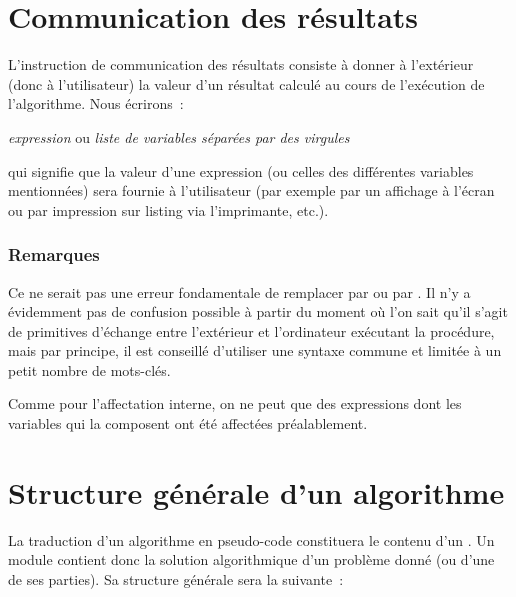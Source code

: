 	\section{Communication des résultats}

		L’instruction de communication des résultats consiste à donner à
		l’extérieur (donc à l’utilisateur) la valeur d’un résultat 
		calculé au cours de l’exécution de l’algorithme. Nous écrirons~:

			\begin{Pseudocode}
			\Write \textit{expression} ou \textit{liste de variables séparées par des virgules}
			\end{Pseudocode}

		qui signifie que la valeur d’une expression (ou celles des différentes
		variables mentionnées) sera fournie à l’utilisateur (par exemple par un
		affichage à l’écran ou par impression sur listing via l’imprimante,
		etc.).

		\subsubsection*{Remarques}

		\begin{liste}
		\item
			Ce ne serait pas une erreur fondamentale de remplacer
			 par  ou
			 par . Il n’y a
			évidemment pas de confusion possible à partir du moment où l’on sait
			qu’il s’agit de primitives d’échange entre l’extérieur et l’ordinateur
			exécutant la procédure, mais par principe, il est conseillé d’utiliser
			une syntaxe commune et limitée à un petit nombre de mots-clés.
		\item
			Comme pour l’affectation interne, on ne peut 
			que des expressions dont les variables qui la composent ont été 
			affectées préalablement.
		\end{liste}

	\section{Structure générale d’un algorithme}

		La traduction d’un algorithme en pseudo-code constituera le contenu d’un
		. Un module contient donc la solution
		algorithmique d’un problème donné (ou d’une de ses parties). Sa
		structure générale sera la suivante~:

